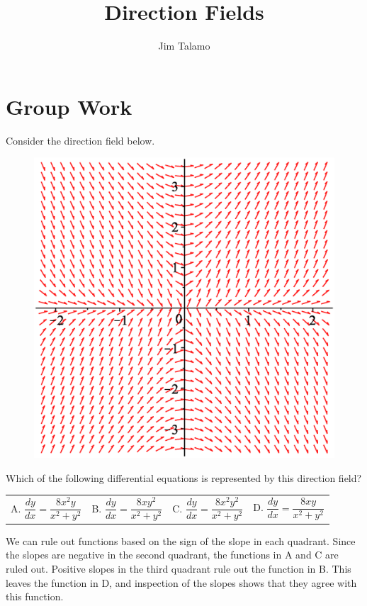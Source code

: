 \documentclass[noauthor]{ximera}
\author{Jim Talamo}
\title{Direction Fields}
\begin{document}
\begin{abstract}
\end{abstract}
\maketitle

\vspace{-0.9in}

\section{Group Work}

\begin{problem} 

Consider the direction field below. 

 \begin{figure}[h!]
 \centering
  \includegraphics[width=.4 \textwidth]{DirectionField1.eps}
\end{figure}

Which of the following differential equations is represented by this direction field? 

\begin{tabular}{llll}

A. $\dfrac{dy}{dx} = \dfrac{8x^2y}{x^2+y^2}$ \qquad & B. $\dfrac{dy}{dx} = \dfrac{8xy^2}{x^2+y^2}$\qquad & C. $\dfrac{dy}{dx} = \dfrac{8x^2y^2}{x^2+y^2}$\qquad & D. $\dfrac{dy}{dx} = \dfrac{8xy}{x^2+y^2}$ 
\end{tabular}

\begin{freeResponse}
We can rule out functions based on the sign of the slope in each quadrant. Since the slopes are negative in the second quadrant, the functions in A and C are ruled out. Positive slopes in the third quadrant rule out the function in B. This leaves the function in D, and inspection of the slopes shows that they agree with this function.
\end{freeResponse}
\end{problem}
\end{document}
